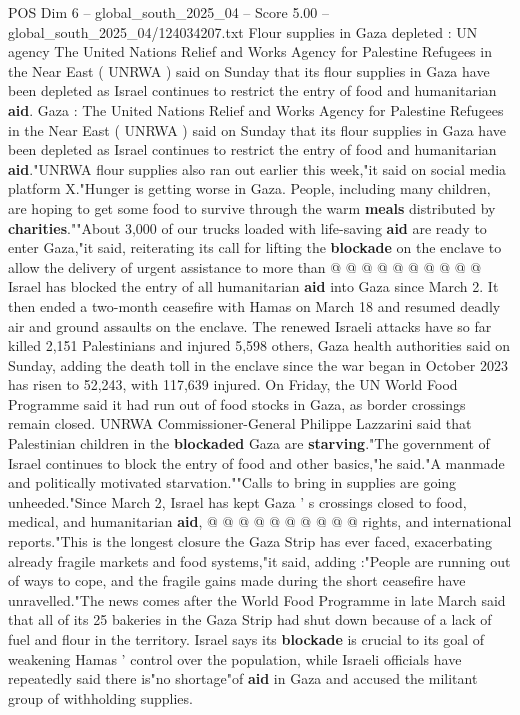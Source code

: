 \begin{textsample}{POS Dim 6 – global\_south\_2025\_04 – Score 5.00 – global\_south\_2025\_04/124034207.txt}  \label{ex:f6_pos_233}
Flour supplies in Gaza depleted : UN agency The United Nations Relief and Works Agency for Palestine Refugees in the Near East ( UNRWA ) said on Sunday that its flour supplies in Gaza have been depleted as Israel continues to restrict the entry of food and humanitarian \textbf{aid}.
Gaza : The United Nations Relief and Works Agency for Palestine Refugees in the Near East ( UNRWA ) said on Sunday that its flour supplies in Gaza have been depleted as Israel continues to restrict the entry of food and humanitarian \textbf{aid}."UNRWA flour supplies also ran out earlier this week,"it said on social media platform X."Hunger is getting worse in Gaza.
People, including many children, are hoping to get some food to survive through the warm \textbf{meals} distributed by \textbf{charities}.""About 3,000 of our trucks loaded with life-saving \textbf{aid} are ready to enter Gaza,"it said, reiterating its call for lifting the \textbf{blockade} on the enclave to allow the delivery of urgent assistance to more than @ @ @ @ @ @ @ @ @ @ Israel has blocked the entry of all humanitarian \textbf{aid} into Gaza since March 2.
It then ended a two-month ceasefire with Hamas on March 18 and resumed deadly air and ground assaults on the enclave.
The renewed Israeli attacks have so far killed 2,151 Palestinians and injured 5,598 others, Gaza health authorities said on Sunday, adding the death toll in the enclave since the war began in October 2023 has risen to 52,243, with 117,639 injured.
On Friday, the UN World Food Programme said it had run out of food stocks in Gaza, as border crossings remain closed.
UNRWA Commissioner-General Philippe Lazzarini said that Palestinian children in the \textbf{blockaded} Gaza are \textbf{starving}."The government of Israel continues to block the entry of food and other basics,"he said."A manmade and politically motivated starvation.""Calls to bring in supplies are going unheeded."Since March 2, Israel has kept Gaza ' s crossings closed to food, medical, and humanitarian \textbf{aid}, @ @ @ @ @ @ @ @ @ @ rights, and international reports."This is the longest closure the Gaza Strip has ever faced, exacerbating already fragile markets and food systems,"it said, adding :"People are running out of ways to cope, and the fragile gains made during the short ceasefire have unravelled."The news comes after the World Food Programme in late March said that all of its 25 bakeries in the Gaza Strip had shut down because of a lack of fuel and flour in the territory.
Israel says its \textbf{blockade} is crucial to its goal of weakening Hamas ' control over the population, while Israeli officials have repeatedly said there is"no shortage"of \textbf{aid} in Gaza and accused the militant group of withholding supplies.

\end{textsample}

